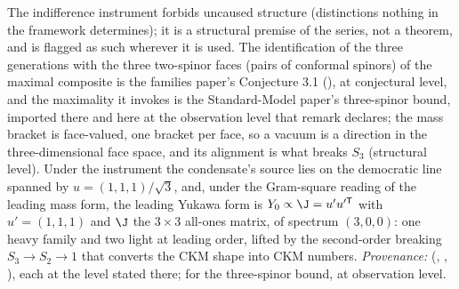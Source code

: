 The indifference instrument forbids uncaused structure (distinctions nothing in the framework determines); it is a structural premise of the series, not a theorem, and is flagged as such wherever it is used. The identification of the three generations with the three two-spinor faces (pairs of conformal spinors) of the maximal composite is the families paper's Conjecture 3.1 (), at conjectural level, and the maximality it invokes is the Standard-Model paper's three-spinor bound, imported there and here at the observation level that remark declares; the mass bracket is face-valued, one bracket per face, so a vacuum is a direction in the three-dimensional face space, and its alignment is what breaks $S_{3}$ (structural level). Under the instrument the condensate's source lies on the democratic line spanned by $u = (1,1,1)/\sqrt{3}$, and, under the Gram-square reading of the leading mass form, the leading Yukawa form is $Y_{0} \propto \J = u'u'^{\mathsf{T}}$ with $u' = (1,1,1)$ and $\J$ the $3 \times 3$ all-ones matrix, of spectrum $(3, 0, 0)$: one heavy family and two light at leading order, lifted by the second-order breaking $S_{3} \to S_{2} \to 1$ that converts the CKM shape into CKM numbers. \emph{Provenance:} \cite[Fact~2.5, Conj.~3.1, Prop.~4.3, Prop.~4.4(1)]{ButlerT13} (, , ), each at the level stated there; \cite[Rem.~3.3]{ButlerT12} for the three-spinor bound, at observation level.
